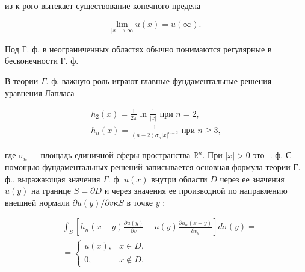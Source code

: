 \documentclass[10pt]{article}
\begin{document}
из к-рого вытекает существование конечного предела



\[

\lim _{|x| \rightarrow \infty} u(x)=u(\infty) \text {. }

\]



Под Г. ф. в неограниченных областях обычно понимаются регулярные в бесконечности $Г$. ф.



В теории $\Gamma$. ф. важную роль играют главные фундаментальные решения уравнения Лапласа



\[

\begin{gathered}

h_{2}(x)=\frac{1}{2 \pi} \ln \frac{1}{|x|} \text { при } n=2, \\

h_{n}(x)=\frac{1}{(n-2) \sigma_{n}|x|^{n-2}} \text { при } n \geqslant 3,

\end{gathered}

\]



где $\sigma_{n}-$ площадь единичной сферы пространства $\mathbb{R}^{n}$. При $|x|>0$ это- . ф. С помощью фундаментальных решений записывается основная формула теории Г. ф., выражающая значения $\Gamma$. ф. $u(x)$ внутри области $D$ через ее значения $u(y)$ на границе $S=\partial D$ и через значения ее производной по направлению внешней нормали $\partial u(y) / \partial v \boldsymbol{\kappa} S$ в точке $y$ :



\[

\begin{aligned}

& \int_{S}\left[h_{n}(x-y) \frac{\partial u(y)}{\partial v}-u(y) \frac{\partial h_{n}(x-y)}{\partial v_{y}}\right] d \sigma(y)= \\

& =\left\{\begin{array}{cc}

u(x), & x \in D, \\

0, & x \notin \bar{D} .

\end{array}\right.

\end{aligned}

\]
\end{document}
